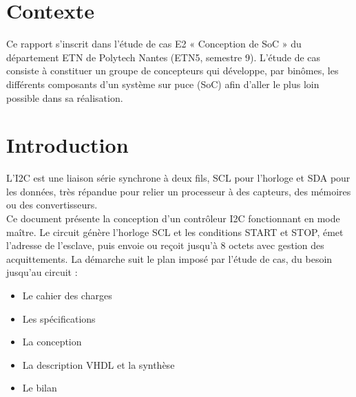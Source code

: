 \section{Contexte}

Ce rapport s'inscrit dans l'étude de cas E2 « Conception de SoC » du département ETN de Polytech Nantes (ETN5, semestre 9). L'étude de cas consiste à constituer un groupe de concepteurs qui développe, par binômes, les différents composants d'un système sur puce (SoC) afin d'aller le plus loin possible dans sa réalisation.
\\

\section{Introduction}

L'I2C est une liaison série synchrone à deux fils, SCL pour l'horloge et SDA pour les données, très répandue pour relier un processeur à des capteurs, des mémoires ou des convertisseurs. 
\\

Ce document présente la conception d'un contrôleur I2C fonctionnant en mode maître. Le circuit génère l'horloge SCL et les conditions START et STOP, émet l'adresse de l'esclave, puis envoie ou reçoit jusqu'à 8 octets avec gestion des acquittements. 
La démarche suit le plan imposé par l'étude de cas, du besoin jusqu'au circuit :
\\

\begin{itemize}
    \item Le cahier des charges
    \item Les spécifications
    \item La conception
    \item La description VHDL et la synthèse
    \item Le bilan
\end{itemize}
